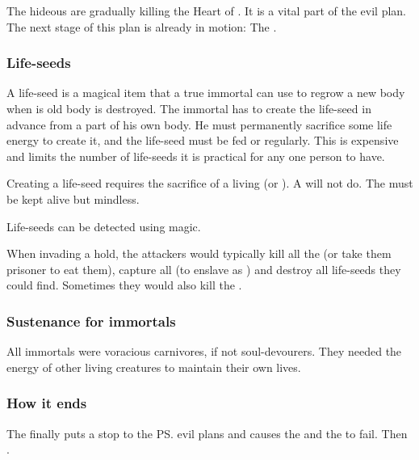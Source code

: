 The hideous \sephiroth{} are gradually killing the Heart of \Miith{}. 
It is a vital part of the \psp{\banelords}{} evil plan. 
The next stage of this plan is already in motion: 
The . 





\subsubsection{Life-seeds}
A life-seed is a magical item that a true immortal can use to regrow a new body when is old body is destroyed. 
The immortal has to create the life-seed in advance from a part of his own body.
He must permanently sacrifice some life energy to create it, and the life-seed must be fed or  regularly.
This is expensive and limits the number of life-seeds it is practical for any one person to have. 

Creating a \resphan life-seed requires the sacrifice of a living \human (or \resphan). 
A \nephil will not do. 
The \human must be kept alive but mindless. 

Life-seeds can be detected using magic.

When invading a \resphan hold, the attackers would typically kill all the \resphain (or take them prisoner to eat them), capture all \resviel (to enslave as \yurideth) and destroy all life-seeds they could find.
Sometimes they would also kill the \humans.





\subsubsection{Sustenance for immortals}
All immortals were voracious carnivores, if not soul-devourers. 
They needed the energy of other living creatures to maintain their own lives. 





\subsubsection{How it ends}
The  finally puts a stop to the \ps{\banes}{} evil plans and causes the \sephiroth{} and the \Morbus{} to fail. 
Then . 









